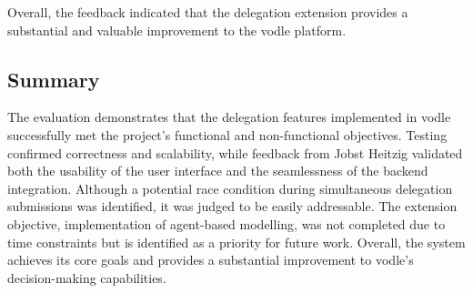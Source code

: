 Overall, the feedback indicated that the delegation extension provides a substantial and valuable improvement to the vodle platform.

\subsection{Summary}

The evaluation demonstrates that the delegation features implemented in vodle successfully met the project's functional and non-functional objectives. Testing confirmed correctness and scalability, while feedback from Jobst Heitzig validated both the usability of the user interface and the seamlessness of the backend integration. Although a potential race condition during simultaneous delegation submissions was identified, it was judged to be easily addressable. The extension objective, implementation of agent-based modelling, was not completed due to time constraints but is identified as a priority for future work. Overall, the system achieves its core goals and provides a substantial improvement to vodle's decision-making capabilities.
